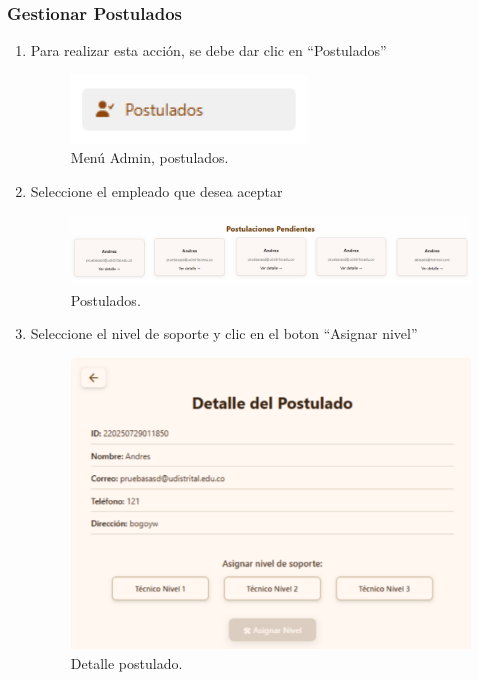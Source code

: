 \subsubsection{Gestionar Postulados}
\begin{enumerate}
    \item Para realizar esta acción, se debe dar clic en “Postulados”
    \begin{figure}[H]
        \centering
        \includegraphics[width=0.3\linewidth]{guiamodulo/menu-admin-postulados.png}
        \caption{Menú Admin, postulados.}
        \label{fig:menu-admin-postulados}
    \end{figure}

    \item Seleccione el empleado que desea aceptar
    \begin{figure}[H]
        \centering
        \includegraphics[width=0.8\linewidth]{guiamodulo/admin-postulados.png}
        \caption{Postulados.}
        \label{fig:admin-postulados}
    \end{figure}

    \item Seleccione el nivel de soporte y clic en el boton “Asignar nivel”
    \begin{figure}[H]
        \centering
        \includegraphics[width=0.6\linewidth]{guiamodulo/admin-postulados-detalle.png}
        \caption{Detalle postulado.}
        \label{fig:admin-postulados-detalle}
    \end{figure}
\end{enumerate}

